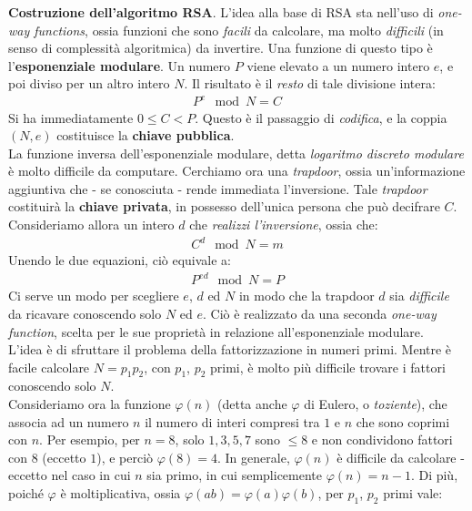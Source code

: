 \documentclass[../../InformazioneQuantistica.tex]{subfiles}
\begin{document}
\begin{expl}
\textbf{Costruzione dell'algoritmo RSA}. L'idea alla base di RSA sta nell'uso di \textit{one-way functions}, ossia funzioni che sono \textit{facili} da calcolare, ma molto \textit{difficili} (in senso di complessità algoritmica) da invertire. Una funzione di questo tipo è l'\textbf{esponenziale modulare}. Un numero $P$ viene elevato a un numero intero $e$, e poi diviso per un altro intero $N$. Il risultato è il \textit{resto} di tale divisione intera:
\begin{align*}
    P^e \mod N = C
\end{align*}
Si ha immediatamente $0\leq C < P$. Questo è il passaggio di \textit{codifica}, e la coppia $(N,e)$ costituisce la \textbf{chiave pubblica}.\\
La funzione inversa dell'esponenziale modulare, detta \textit{logaritmo discreto modulare} è molto difficile da computare. Cerchiamo ora una \textit{trapdoor}, ossia un'informazione aggiuntiva che - se conosciuta - rende immediata l'inversione. Tale \textit{trapdoor} costituirà la \textbf{chiave privata}, in possesso dell'unica persona che può decifrare $C$.\\
Consideriamo allora un intero $d$ che \textit{realizzi l'inversione}, ossia che:
\begin{align*}
    C^d \mod N = m
\end{align*}
Unendo le due equazioni, ciò equivale a:
\begin{align}
    P^{ed} \mod N = P
    \label{eqn:Ped}
\end{align}
Ci serve un modo per scegliere $e$, $d$ ed $N$ in modo che la trapdoor $d$ sia \textit{difficile} da ricavare conoscendo solo $N$ ed $e$. Ciò è realizzato da una seconda \textit{one-way function}, scelta per le sue proprietà in relazione all'esponenziale modulare.\\
L'idea è di sfruttare il problema della fattorizzazione in numeri primi. Mentre è facile calcolare $N=p_1 p_2$, con $p_1$, $p_2$ primi, è molto più difficile trovare i fattori conoscendo solo $N$.\\
Consideriamo ora la funzione $\varphi(n)$ (detta anche $\varphi$ di Eulero, o \textit{toziente}), che associa ad un numero $n$ il numero di interi compresi tra $1$ e $n$ che sono coprimi con $n$. Per esempio, per $n=8$, solo $1,3,5,7$ sono $\leq 8$ e non condividono fattori con $8$ (eccetto $1$), e perciò $\varphi(8)=4$. In generale, $\varphi(n)$ è difficile da calcolare - eccetto nel caso in cui $n$ sia primo, in cui semplicemente $\varphi(n) = n-1$. Di più, poiché $\varphi$ è moltiplicativa, ossia $\varphi(ab) = \varphi(a) \varphi(b)$, per $p_1$, $p_2$ primi vale:

\end{expl}
\end{document}
